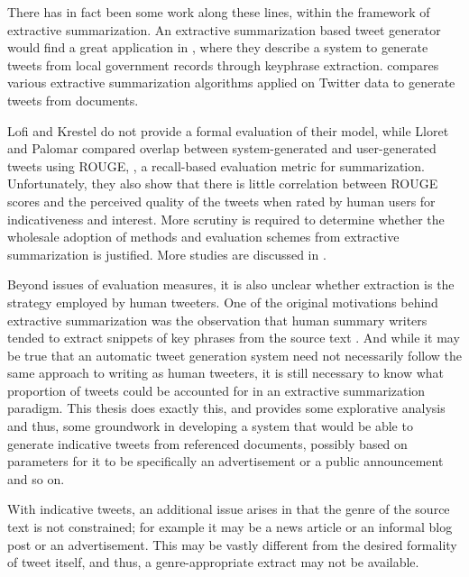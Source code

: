There has in fact been some work along these lines, within the framework of extractive summarization. An extractive summarization based tweet generator would find a great application in \cite{lofi2012iparticipate}, where they describe a system to generate tweets from local government records through keyphrase extraction. \cite{lloret2013towards} compares various extractive summarization algorithms applied on Twitter data to generate tweets from documents. 

Lofi and Krestel do not provide a formal evaluation of their model, while Lloret and Palomar compared overlap between system-generated and user-generated tweets using ROUGE, 
\citep{lin2004rouge}, a recall-based evaluation metric for summarization. Unfortunately, they also show that there is little correlation between ROUGE scores and the perceived quality of the tweets when rated by human users for indicativeness and interest. More scrutiny is required to determine whether the wholesale adoption of methods and evaluation schemes from extractive summarization is justified. More studies are discussed in .

Beyond issues of evaluation measures, it is also unclear whether extraction is the strategy employed by human tweeters. One of the original motivations behind extractive summarization was the observation that human summary writers tended to extract snippets of key phrases from the source text \cite{mani-2001}.  And while it may be true that an automatic tweet generation system need not necessarily follow the same approach to writing as human tweeters, it is still necessary to know what proportion of tweets could be accounted for in an extractive summarization paradigm. This thesis does exactly this, and provides some explorative analysis and thus, some groundwork in developing a system that would be able to generate indicative tweets from referenced documents, possibly based on parameters for it to be specifically an advertisement or a public announcement and so on.

With indicative tweets, an additional issue arises in that the genre of the source text is not constrained; for example it may be a news article or an informal blog post or an advertisement. This may be vastly different from the desired formality of tweet itself, and thus, a genre-appropriate extract may not be available.

